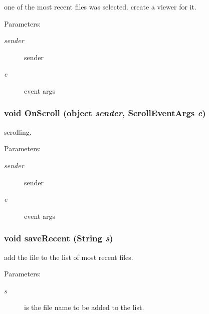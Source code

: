 one of the most recent files was selected. create a viewer for it. 

\begin{Desc}
\item[Parameters:]
\begin{description}
\item[{\em sender}]sender \item[{\em e}]event args \end{description}
\end{Desc}
\subsubsection{\setlength{\rightskip}{0pt plus 5cm}void On\-Scroll (object {\em sender}, Scroll\-Event\-Args {\em e})\hspace{0.3cm}{\tt  [private]}}\label{class_c_s_image_viewer_1_1_c_s_image_viewer_4030669df2b2fa92fec0e187b32105f0}


scrolling. 

\begin{Desc}
\item[Parameters:]
\begin{description}
\item[{\em sender}]sender \item[{\em e}]event args \end{description}
\end{Desc}
\subsubsection{\setlength{\rightskip}{0pt plus 5cm}void save\-Recent (String {\em s})\hspace{0.3cm}{\tt  [private]}}\label{class_c_s_image_viewer_1_1_c_s_image_viewer_1b22852cf7fa95b3461e8a45c70a375f}


add the file to the list of most recent files. 

\begin{Desc}
\item[Parameters:]
\begin{description}
\item[{\em s}]is the file name to be added to the list. \end{description}
\end{Desc}


